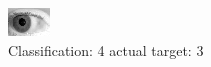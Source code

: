 \begin{figure}[h!]
\begin{center}
\includegraphics[width=0.60\columnwidth]{figures/ID250_class_4_target_3.png}
\end{center}
\caption{ Classification: 4 actual target: 3}
\label{fig:ID250_class_4_target_3}
\end{figure}
